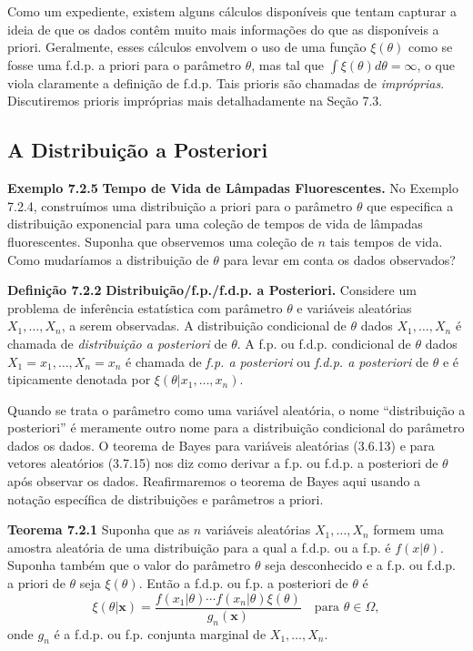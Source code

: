 Como um expediente, existem alguns cálculos disponíveis que tentam capturar a ideia de que os dados contêm muito mais informações do que as disponíveis a priori. Geralmente, esses cálculos envolvem o uso de uma função $\xi(\theta)$ como se fosse uma f.d.p. a priori para o parâmetro $\theta$, mas tal que $\int\xi(\theta)d\theta = \infty$, o que viola claramente a definição de f.d.p. Tais prioris são chamadas de \textit{impróprias}. Discutiremos prioris impróprias mais detalhadamente na Seção 7.3.

\subsection*{A Distribuição a Posteriori}

\noindent\textbf{Exemplo 7.2.5} \quad \textbf{Tempo de Vida de Lâmpadas Fluorescentes.} No Exemplo 7.2.4, construímos uma distribuição a priori para o parâmetro $\theta$ que especifica a distribuição exponencial para uma coleção de tempos de vida de lâmpadas fluorescentes. Suponha que observemos uma coleção de $n$ tais tempos de vida. Como mudaríamos a distribuição de $\theta$ para levar em conta os dados observados?

\vspace{1cm}
\noindent\textbf{Definição 7.2.2} \quad \textbf{Distribuição/f.p./f.d.p. a Posteriori.} Considere um problema de inferência estatística com parâmetro $\theta$ e variáveis aleatórias $X_1, \dots, X_n$, a serem observadas. A distribuição condicional de $\theta$ dados $X_1, \dots, X_n$ é chamada de \textit{distribuição a posteriori} de $\theta$. A f.p. ou f.d.p. condicional de $\theta$ dados $X_1=x_1, \dots, X_n=x_n$ é chamada de \textit{f.p. a posteriori} ou \textit{f.d.p. a posteriori} de $\theta$ e é tipicamente denotada por $\xi(\theta|x_1, \dots, x_n)$.

\vspace{1cm}
Quando se trata o parâmetro como uma variável aleatória, o nome ``distribuição a posteriori'' é meramente outro nome para a distribuição condicional do parâmetro dados os dados. O teorema de Bayes para variáveis aleatórias (3.6.13) e para vetores aleatórios (3.7.15) nos diz como derivar a f.p. ou f.d.p. a posteriori de $\theta$ após observar os dados. Reafirmaremos o teorema de Bayes aqui usando a notação específica de distribuições e parâmetros a priori.

\vspace{1cm}
\noindent\textbf{Teorema 7.2.1} \quad Suponha que as $n$ variáveis aleatórias $X_1, \dots, X_n$ formem uma amostra aleatória de uma distribuição para a qual a f.d.p. ou a f.p. é $f(x|\theta)$. Suponha também que o valor do parâmetro $\theta$ seja desconhecido e a f.p. ou f.d.p. a priori de $\theta$ seja $\xi(\theta)$. Então a f.d.p. ou f.p. a posteriori de $\theta$ é
$$ \xi(\theta|\mathbf{x}) = \frac{f(x_1|\theta)\cdots f(x_n|\theta)\xi(\theta)}{g_n(\mathbf{x})} \quad \text{para } \theta \in \Omega, $$
onde $g_n$ é a f.d.p. ou f.p. conjunta marginal de $X_1, \dots, X_n$.

